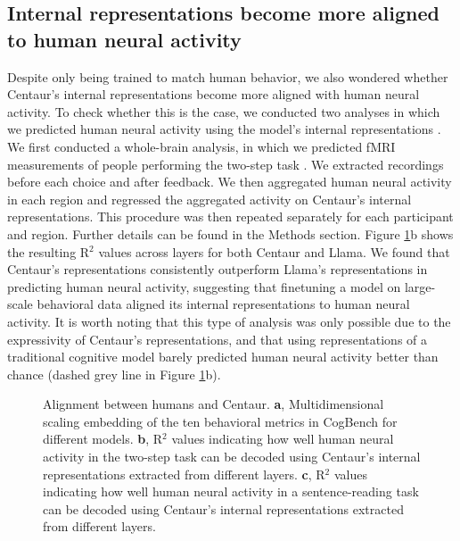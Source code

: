 \documentclass[pdflatex,sn-nature]{sn-jnl}%
\theoremstyle{thmstyleone}%
\theoremstyle{thmstyletwo}%
\theoremstyle{thmstylethree}%
\begin{document}
\subsection*{Internal representations become more aligned to human neural activity}\label{subsec2}

Despite only being trained to match human behavior, we also wondered whether Centaur’s internal representations become more aligned with human neural activity. To check whether this is the case, we conducted two analyses in which we predicted human neural activity using the model's internal representations \cite{yamins2014performance, schrimpf2021neural}. We first conducted a whole-brain analysis, in which we predicted fMRI measurements of people performing the two-step task \cite{feher2023rethinking}. We extracted recordings before each choice and after feedback. We then aggregated human neural activity in each region and regressed the aggregated activity on Centaur's internal representations. This procedure was then repeated separately for each participant and region. Further details can be found in the Methods section. Figure \ref{fig:fig4}b shows the resulting R$^2$ values across layers for both Centaur and Llama. We found that Centaur's representations consistently outperform Llama's representations in predicting human neural activity, suggesting that finetuning a model on large-scale behavioral data aligned its internal representations to human neural activity. It is worth noting that this type of analysis was only possible due to the expressivity of Centaur's representations, and that using representations of a traditional cognitive model barely predicted human neural activity better than chance (dashed grey line in Figure \ref{fig:fig4}b).

\begin{figure}
    \centering
    \caption{Alignment between humans and Centaur. \textbf{a}, Multidimensional scaling embedding of the ten behavioral metrics in CogBench \cite{pmlr-v235-coda-forno24a} for different models. \textbf{b}, R$^2$ values indicating how well human neural activity in the two-step task \cite{feher2023rethinking} can be decoded using Centaur's internal representations extracted from different layers. \textbf{c}, R$^2$ values indicating how well human neural activity in a sentence-reading task \cite{tuckute2024driving} can be decoded using Centaur's internal representations extracted from different layers.}
    \label{fig:fig4}
\end{figure}
\end{document}
